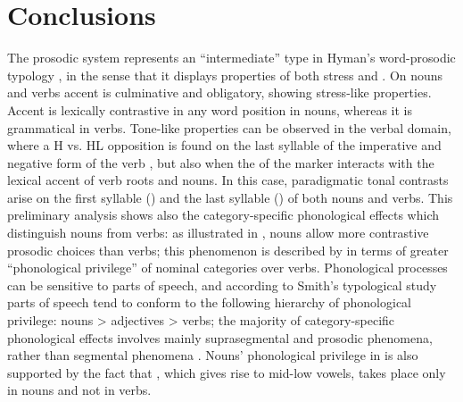\documentclass[output=paper]{LSP/langsci}
\begin{document}
\section{Conclusions} \label{sec:Petrollino:4}
The  prosodic system represents an “intermediate” type in Hyman's word-prosodic typology \citep{Hyman2006,Hyman2009}, in the sense that it displays properties of both stress and . On nouns and verbs accent is culminative and obligatory, showing stress-like properties. Accent is lexically contrastive in any word position in nouns, whereas it is grammatical in verbs. Tone-like properties can be observed in the verbal domain, where a H vs. HL opposition is found on the last syllable of the imperative and negative form of the verb , but also when the  of the   marker interacts with the lexical accent of verb roots and nouns. In this case, paradigmatic tonal contrasts arise on the first syllable () and the last syllable () of both nouns and verbs.
This preliminary analysis shows also the category-specific phonological effects which distinguish  nouns from verbs: as illustrated in ,  nouns allow more contrastive prosodic choices than verbs; this phenomenon is described by \citet{Smith2011} in terms of greater “phonological privilege” of nominal categories over verbs. Phonological processes can be sensitive to parts of speech, and according to Smith's typological study parts of speech tend to conform to the following hierarchy of phonological privilege: nouns > adjectives > verbs; the majority of category-specific phonological effects involves mainly suprasegmental and prosodic phenomena, rather than segmental phenomena \citep[2448]{Smith2011}. Nouns' phonological privilege in  is also supported by the fact that , which gives rise to mid-low vowels, takes place only in nouns and not in verbs.
\end{document}
